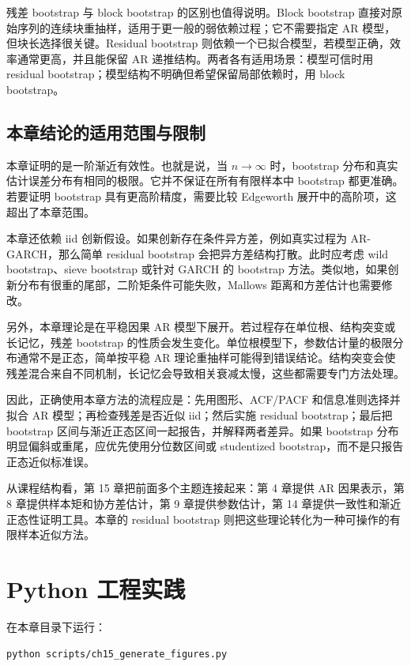 \documentclass[11pt,a4paper]{ctexart}
\begin{document}
残差 bootstrap 与 block bootstrap 的区别也值得说明。Block bootstrap 直接对原始序列的连续块重抽样，适用于更一般的弱依赖过程；它不需要指定 AR 模型，但块长选择很关键。Residual bootstrap 则依赖一个已拟合模型，若模型正确，效率通常更高，并且能保留 AR 递推结构。两者各有适用场景：模型可信时用 residual bootstrap；模型结构不明确但希望保留局部依赖时，用 block bootstrap。

\subsection{本章结论的适用范围与限制}

本章证明的是一阶渐近有效性。也就是说，当 \(n\to\infty\) 时，bootstrap 分布和真实估计误差分布有相同的极限。它并不保证在所有有限样本中 bootstrap 都更准确。若要证明 bootstrap 具有更高阶精度，需要比较 Edgeworth 展开中的高阶项，这超出了本章范围。

本章还依赖 iid 创新假设。如果创新存在条件异方差，例如真实过程为 AR-GARCH，那么简单 residual bootstrap 会把异方差结构打散。此时应考虑 wild bootstrap、sieve bootstrap 或针对 GARCH 的 bootstrap 方法。类似地，如果创新分布有很重的尾部，二阶矩条件可能失败，Mallows 距离和方差估计也需要修改。

另外，本章理论是在平稳因果 AR 模型下展开。若过程存在单位根、结构突变或长记忆，残差 bootstrap 的性质会发生变化。单位根模型下，参数估计量的极限分布通常不是正态，简单按平稳 AR 理论重抽样可能得到错误结论。结构突变会使残差混合来自不同机制，长记忆会导致相关衰减太慢，这些都需要专门方法处理。

因此，正确使用本章方法的流程应是：先用图形、ACF/PACF 和信息准则选择并拟合 AR 模型；再检查残差是否近似 iid；然后实施 residual bootstrap；最后把 bootstrap 区间与渐近正态区间一起报告，并解释两者差异。如果 bootstrap 分布明显偏斜或重尾，应优先使用分位数区间或 studentized bootstrap，而不是只报告正态近似标准误。

从课程结构看，第 15 章把前面多个主题连接起来：第 4 章提供 AR 因果表示，第 8 章提供样本矩和协方差估计，第 9 章提供参数估计，第 14 章提供一致性和渐近正态性证明工具。本章的 residual bootstrap 则把这些理论转化为一种可操作的有限样本近似方法。

\section{Python 工程实践}

在本章目录下运行：
\begin{lstlisting}[language=bash]
python scripts/ch15_generate_figures.py
\end{lstlisting}
\end{document}
